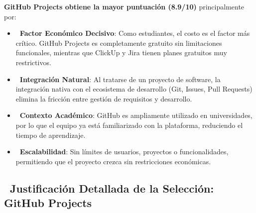 \documentclass[12pt,a4paper]{article}
\begin{document}
\begin{tcolorbox}[colback=successgreen!10, colframe=successgreen, rounded corners, title=\textbf{\faCheck\ Resultado del Análisis Comparativo}]
\textbf{GitHub Projects obtiene la mayor puntuación (8.9/10)} principalmente por:

\begin{itemize}[itemsep=0.4em]
    \item \textbf{\faDollarSign\ Factor Económico Decisivo}: Como estudiantes, el costo es el factor más crítico. GitHub Projects es completamente gratuito sin limitaciones funcionales, mientras que ClickUp y Jira tienen planes gratuitos muy restrictivos.
    
    \item \textbf{\faCodeBranch\ Integración Natural}: Al tratarse de un proyecto de software, la integración nativa con el ecosistema de desarrollo (Git, Issues, Pull Requests) elimina la fricción entre gestión de requisitos y desarrollo.
    
    \item \textbf{\faUniversity\ Contexto Académico}: GitHub es ampliamente utilizado en universidades, por lo que el equipo ya está familiarizado con la plataforma, reduciendo el tiempo de aprendizaje.
    
    \item \textbf{\faInfinity\ Escalabilidad}: Sin límites de usuarios, proyectos o funcionalidades, permitiendo que el proyecto crezca sin restricciones económicas.
\end{itemize}
\end{tcolorbox}

\subsection{\faCrown\ Justificación Detallada de la Selección: GitHub Projects}
\end{document}

